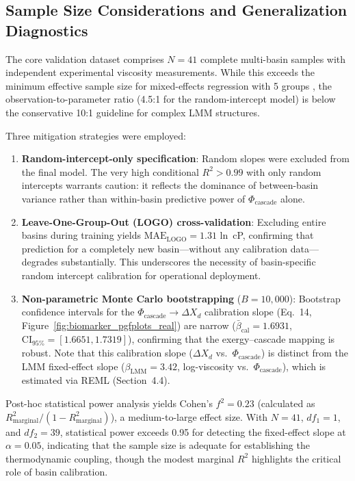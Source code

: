 \documentclass[review,12pt]{elsarticle}
\begin{document}
\subsection{Sample Size Considerations and Generalization Diagnostics}
The core validation dataset comprises $N = 41$ complete multi-basin samples with independent experimental viscosity measurements. While this exceeds the minimum effective sample size for mixed-effects regression with 5 groups \citep[$N_{\text{eff}} \geq 30$;][]{snijders2012multilevel}, the observation-to-parameter ratio (4.5:1 for the random-intercept model) is below the conservative 10:1 guideline for complex LMM structures.

Three mitigation strategies were employed:
\begin{enumerate}
    \item \textbf{Random-intercept-only specification}: Random slopes were excluded from the final model. The very high conditional $R^2 > 0.99$ with only random intercepts warrants caution: it reflects the dominance of between-basin variance rather than within-basin predictive power of $\Phi_{\text{cascade}}$ alone.
    \item \textbf{Leave-One-Group-Out (LOGO) cross-validation}: Excluding entire basins during training yields $\text{MAE}_{\text{LOGO}} = 1.31$ ln~cP, confirming that prediction for a completely new basin---without any calibration data---degrades substantially. This underscores the necessity of basin-specific random intercept calibration for operational deployment.
    \item \textbf{Non-parametric Monte Carlo bootstrapping} ($B = 10{,}000$): Bootstrap confidence intervals for the $\Phi_{\text{cascade}} \to \Delta X_d$ calibration slope (Eq.~14, Figure~\ref{fig:biomarker_pgfplots_real}) are narrow ($\bar{\beta}_{\text{cal}} = 1.6931$, $\text{CI}_{95\%} = [1.6651, 1.7319]$), confirming that the exergy--cascade mapping is robust. Note that this calibration slope ($\Delta X_d$ vs.\ $\Phi_{\text{cascade}}$) is distinct from the LMM fixed-effect slope ($\beta_{\text{LMM}} = 3.42$, log-viscosity vs.\ $\Phi_{\text{cascade}}$), which is estimated via REML (Section~4.4).
\end{enumerate}

Post-hoc statistical power analysis yields Cohen's $f^2 = 0.23$ (calculated as $R^2_{\text{marginal}} / (1 - R^2_{\text{marginal}})$), a medium-to-large effect size. With $N = 41$, $df_1 = 1$, and $df_2 = 39$, statistical power exceeds 0.95 for detecting the fixed-effect slope at $\alpha = 0.05$, indicating that the sample size is adequate for establishing the thermodynamic coupling, though the modest marginal $R^2$ highlights the critical role of basin calibration.
\end{document}
